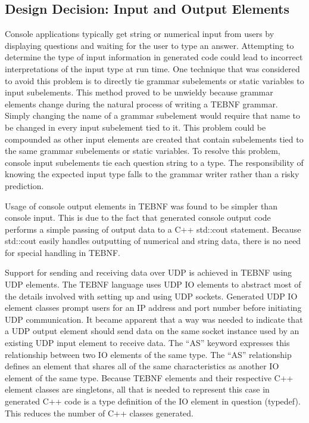 \subsection{Design Decision: Input and Output Elements}
Console applications typically get string or numerical input from users by displaying questions and waiting for the user to type an answer.  Attempting to determine the type of input information in generated code could lead to incorrect interpretations of the input type at run time.  One technique that was considered to avoid this problem is to directly tie grammar subelements or static variables to input subelements.  This method proved to be unwieldy because grammar elements change during the natural process of writing a TEBNF grammar.  Simply changing the name of a grammar subelement would require that name to be changed in every input subelement tied to it.  This problem could be compounded as other input elements are created that contain subelements tied to the same grammar subelements or static variables.   To resolve this problem, console input subelements tie each question string to a type.  The responsibility of knowing the expected input type falls to the grammar writer rather than a risky prediction.

\indent
Usage of console output elements in TEBNF was found to be simpler than console input.  This is due to the fact that generated console output code performs a simple passing of output data to a C++ std::cout statement.   Because std::cout easily handles outputting of numerical and string data, there is no need for special handling in TEBNF.

\indent
Support for sending and receiving data over UDP is achieved in TEBNF using UDP elements.  The TEBNF language uses UDP IO elements to abstract most of the details involved with setting up and using UDP sockets.  Generated UDP IO element classes prompt users for an IP address and port number before initiating UDP communication.  It became apparent that a way was needed to indicate that a UDP output element should send data on the same socket instance used by an existing UDP input element to receive data.  The “AS” keyword expresses this relationship between two IO elements of the same type.  The “AS” relationship defines an element that shares all of the same characteristics as another IO element of the same type.  Because TEBNF elements and their respective C++ element classes are singletons, all that is needed to represent this case in generated C++ code is a type definition of the IO element in question (typedef).  This reduces the number of C++ classes generated.

